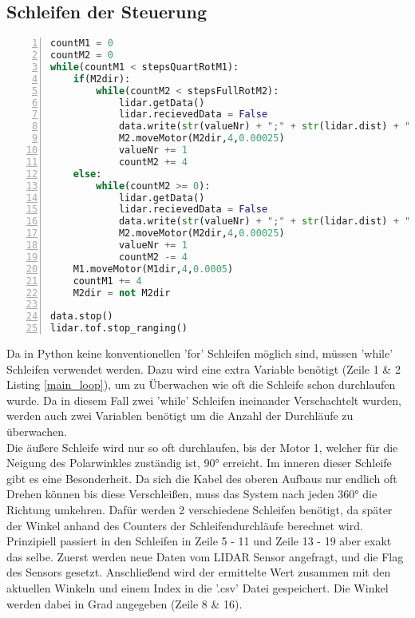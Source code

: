 \subsection{Schleifen der Steuerung}
\begin{lstlisting}[caption={Messen und Aufzeichnen der Entfernungen}, language={Python}, label={main_loop}, numbers=left]
countM1 = 0
countM2 = 0
while(countM1 < stepsQuartRotM1):
    if(M2dir):
        while(countM2 < stepsFullRotM2):
            lidar.getData()
            lidar.recievedData = False
            data.write(str(valueNr) + ";" + str(lidar.dist) + ";" + str(360.0*countM2/stepsFullRotM2) + ";" + str(90.0*countM1/stepsQuartRotM1) + "\n")
            M2.moveMotor(M2dir,4,0.00025)
            valueNr += 1
            countM2 += 4
    else:
        while(countM2 >= 0):
            lidar.getData()
            lidar.recievedData = False
            data.write(str(valueNr) + ";" + str(lidar.dist) + ";" + str(360.0*countM2/stepsFullRotM2) + ";" + str(90.0*countM1/stepsQuartRotM1) + "\n")
            M2.moveMotor(M2dir,4,0.00025)
            valueNr += 1
            countM2 -= 4
    M1.moveMotor(M1dir,4,0.0005)
    countM1 += 4
    M2dir = not M2dir

data.stop()
lidar.tof.stop_ranging()
\end{lstlisting}
Da in Python keine konventionellen 'for' Schleifen möglich sind, müssen 'while' Schleifen verwendet werden. Dazu wird eine extra Variable benötigt (Zeile 1 \& 2 Listing \ref{main_loop}), um zu Überwachen wie oft die Schleife schon durchlaufen wurde. Da in diesem Fall zwei 'while' Schleifen ineinander Verschachtelt wurden, werden auch zwei Variablen benötigt um die Anzahl der Durchläufe zu überwachen. \\
Die äußere Schleife wird nur so oft durchlaufen, bis der Motor 1, welcher für die Neigung des Polarwinkles zuständig ist, 90° erreicht. Im inneren dieser Schleife gibt es eine Besonderheit. Da sich die Kabel des oberen Aufbaus nur endlich oft Drehen können bis diese Verschleißen, muss das System nach jeden 360° die Richtung umkehren. Dafür werden 2 verschiedene Schleifen benötigt, da später der Winkel anhand des Counters der Schleifendurchläufe berechnet wird. Prinzipiell passiert in den Schleifen in Zeile 5 - 11 und Zeile 13 - 19 aber exakt das selbe. Zuerst werden neue Daten vom \ac{LIDAR} Sensor angefragt, und die Flag des Sensors gesetzt. Anschließend wird der ermittelte Wert zusammen mit den aktuellen Winkeln und einem Index in die '.csv' Datei gespeichert. Die Winkel werden dabei in Grad angegeben (Zeile 8 \& 16).\\
